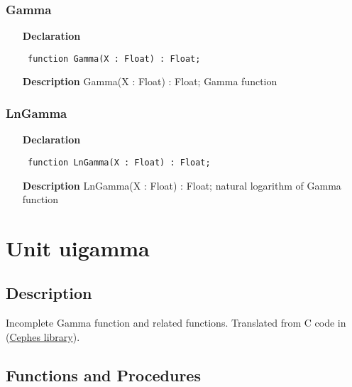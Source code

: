 \documentclass[12pt,a4paper,oneside]{report}
\newcommand{\declarationitem}[1]{\textbf{#1}}
\newcommand{\descriptiontitle}[1]{\textbf{#1}}
\newcommand{\code}[1]{\texttt{#1}}
\begin{document}
\subsubsection{Gamma}
\label{ugamma-Gamma}
\begin{itemize}\item[\declarationitem{Declaration}\hfill]
	\begin{flushleft}
		\code{
			function Gamma(X : Float) : Float;}
		
	\end{flushleft}
	
	\par
	\item[\descriptiontitle{Description}]
	Gamma(X : Float) : Float; Gamma function
	
\end{itemize}
\subsubsection{LnGamma}
\label{ugamma-LnGamma}
\begin{itemize}\item[\declarationitem{Declaration}\hfill]
	\begin{flushleft}
		\code{
			function LnGamma(X : Float) : Float;}
		
	\end{flushleft}
	
	\par
	\item[\descriptiontitle{Description}]
	LnGamma(X : Float) : Float; natural logarithm of Gamma function
	
\end{itemize}
\section{Unit uigamma}
\label{uigamma}
\subsection{Description}
Incomplete Gamma function and related functions. Translated from C code in (\href{http://www.moshier.net}{Cephes library}).

 \subsection{Functions and Procedures}
\end{document}
